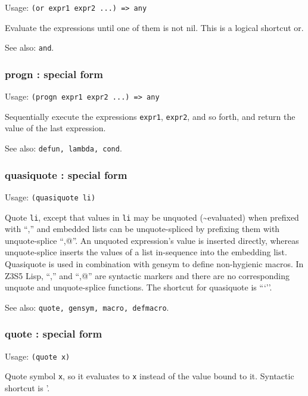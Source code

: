 \documentclass[
]{article}
\newcommand{\passthrough}[1]{#1}
\begin{document}
Usage: \passthrough{\lstinline!(or expr1 expr2 ...) => any!}

Evaluate the expressions until one of them is not nil. This is a logical
shortcut or.

See also: \passthrough{\lstinline!and!}.

\hypertarget{progn-special-form}{%
\subsubsection{progn : special form}\label{progn-special-form}}

Usage: \passthrough{\lstinline!(progn expr1 expr2 ...) => any!}

Sequentially execute the expressions \passthrough{\lstinline!expr1!},
\passthrough{\lstinline!expr2!}, and so forth, and return the value of
the last expression.

See also: \passthrough{\lstinline!defun, lambda, cond!}.

\hypertarget{quasiquote-special-form}{%
\subsubsection{quasiquote : special
form}\label{quasiquote-special-form}}

Usage: \passthrough{\lstinline!(quasiquote li)!}

Quote \passthrough{\lstinline!li!}, except that values in
\passthrough{\lstinline!li!} may be unquoted (\textasciitilde evaluated)
when prefixed with ``,'' and embedded lists can be unquote-spliced by
prefixing them with unquote-splice ``,@''. An unquoted expression's
value is inserted directly, whereas unquote-splice inserts the values of
a list in-sequence into the embedding list. Quasiquote is used in
combination with gensym to define non-hygienic macros. In Z3S5 Lisp,
``,'' and ``,@'' are syntactic markers and there are no corresponding
unquote and unquote-splice functions. The shortcut for quasiquote is
```''.

See also: \passthrough{\lstinline!quote, gensym, macro, defmacro!}.

\hypertarget{quote-special-form}{%
\subsubsection{quote : special form}\label{quote-special-form}}

Usage: \passthrough{\lstinline!(quote x)!}

Quote symbol \passthrough{\lstinline!x!}, so it evaluates to
\passthrough{\lstinline!x!} instead of the value bound to it. Syntactic
shortcut is '.
\end{document}
